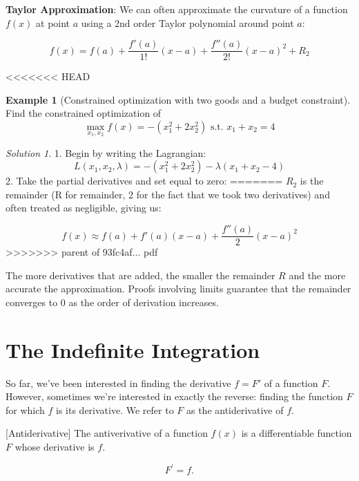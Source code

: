 \documentclass[]{book}
\theoremstyle{definition}
\theoremstyle{definition}
\newtheorem{example}{Example}[chapter]
\theoremstyle{definition}
\theoremstyle{remark}
\newtheorem*{solution}{Solution}
\begin{document}
\textbf{Taylor Approximation}: We can often approximate the curvature of a function \(f(x)\) at point \(a\) using a 2nd order Taylor polynomial around point \(a\):

\[f(x) = f(a) + \frac{f'(a)}{1!} (x-a) +  \frac{f''(a)}{2!} (x-a)^2
+ R_2\]

<<<<<<< HEAD
\begin{example}[Constrained optimization with two goods and a budget constraint]
\protect\hypertarget{exm:unnamed-chunk-60}{}{\label{exm:unnamed-chunk-60} {} }
Find the constrained optimization of
\[\max_{x_1,x_2} f(x) = -(x_1^2 + 2x_2^2) \text{ s.t. } x_1 + x_2 = 4\]
\end{example}

\begin{solution}
{}
1. Begin by writing the Lagrangian:
\[L(x_1, x_2, \lambda) =  -(x_1^2 + 2x_2^2) - \lambda(x_1 + x_2 - 4)\]
2. Take the partial derivatives and set equal to zero:
=======
\(R_2\) is the remainder (R for remainder, 2 for the fact that we took two derivatives) and often treated as negligible,
giving us:

\[f(x) \approx f(a) + f'(a)(x-a) +  \dfrac{f''(a)}{2} (x-a)^2\]
>>>>>>> parent of 93fc4af... pdf

The more derivatives that are added, the smaller the remainder \(R\) and the more accurate the approximation. Proofs involving limits guarantee that the remainder converges to 0 as the order of derivation increases.

\hypertarget{the-indefinite-integration}{%
\section{The Indefinite Integration}\label{the-indefinite-integration}}

So far, we've been interested in finding the derivative \(f=F'\) of a function \(F\). However, sometimes we're interested in exactly the reverse: finding the function \(F\) for which \(f\) is its derivative. We refer to \(F\) as the antiderivative of \(f\).

[Antiderivative]
\protect\hypertarget{def:unnamed-chunk-20}{}{\label{def:unnamed-chunk-20} {} }The antiverivative of a function \(f(x)\) is a differentiable function \(F\) whose derivative is \(f\).

\[F^\prime = f.\]


\end{solution}
\end{document}
